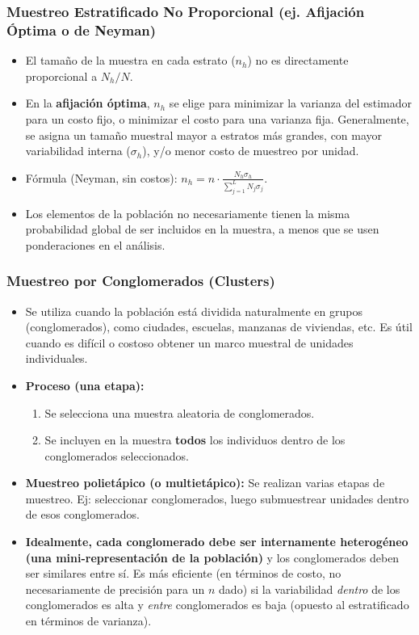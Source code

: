 \documentclass[12pt, letterpaper]{article}
\begin{document}
\subsubsection*{Muestreo Estratificado No Proporcional (ej. Afijación Óptima o de Neyman)}
\begin{itemize}
    \item El tamaño de la muestra en cada estrato ($n_h$) no es directamente proporcional a $N_h/N$.
    \item En la \textbf{afijación óptima}, $n_h$ se elige para minimizar la varianza del estimador para un costo fijo, o minimizar el costo para una varianza fija. Generalmente, se asigna un tamaño muestral mayor a estratos más grandes, con mayor variabilidad interna ($\sigma_h$), y/o menor costo de muestreo por unidad.
    \item Fórmula (Neyman, sin costos): $n_h = n \cdot \frac{N_h \sigma_h}{\sum_{j=1}^{L} N_j \sigma_j}$.
    \item Los elementos de la población no necesariamente tienen la misma probabilidad global de ser incluidos en la muestra, a menos que se usen ponderaciones en el análisis.
\end{itemize}

\subsubsection{Muestreo por Conglomerados (Clusters)}
\begin{itemize}
    \item Se utiliza cuando la población está dividida naturalmente en grupos (conglomerados), como ciudades, escuelas, manzanas de viviendas, etc. Es útil cuando es difícil o costoso obtener un marco muestral de unidades individuales.
    \item \textbf{Proceso (una etapa):}
        \begin{enumerate}
            \item Se selecciona una muestra aleatoria de conglomerados.
            \item Se incluyen en la muestra \textbf{todos} los individuos dentro de los conglomerados seleccionados.
        \end{enumerate}
    \item \textbf{Muestreo polietápico (o multietápico):} Se realizan varias etapas de muestreo. Ej: seleccionar conglomerados, luego submuestrear unidades dentro de esos conglomerados.
    \item \textbf{Idealmente, cada conglomerado debe ser internamente heterogéneo (una mini-representación de la población)} y los conglomerados deben ser similares entre sí. Es más eficiente (en términos de costo, no necesariamente de precisión para un $n$ dado) si la variabilidad \textit{dentro} de los conglomerados es alta y \textit{entre} conglomerados es baja (opuesto al estratificado en términos de varianza).
\end{itemize}
\end{document}

